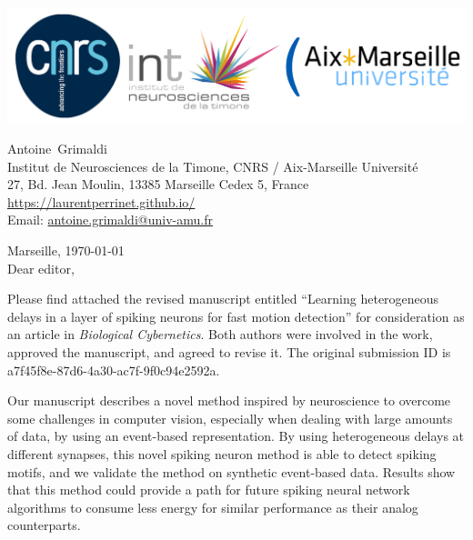 \documentclass[10pt,english]{article}
\makeatletter
\newcommand{\LastName}{Grimaldi}%
\newcommand{\FirstName}{Antoine}%
\newcommand{\Institute}{Institut de Neurosciences de la Timone, CNRS / Aix-Marseille Universit\'e}%
\newcommand{\Address}{27, Bd. Jean Moulin, 13385 Marseille Cedex 5, France}%
\newcommand{\Website}{\url{https://laurentperrinet.github.io/}}%
\newcommand{\Email}{\url{antoine.grimaldi@univ-amu.fr}}%
\makeatother
\begin{document}
\includegraphics[width=.4\textwidth]{troislogos.png}
\\
\vspace{.1\baselineskip}
\hrulefill
\vspace{.1\baselineskip}

\begin{flushright}
	\FirstName\  \LastName\  \\
	\Institute\\[6pt]
	\Address\\%
	\Website \\
	  Email: \Email \\[6pt]
\end{flushright}
\justifying
\vspace{1\baselineskip}
Marseille, 
\today
\\[12pt] %
	
Dear editor,

Please find attached the revised manuscript entitled ``Learning heterogeneous delays in a layer of spiking neurons for fast motion detection'' for consideration as an article in \emph{Biological Cybernetics}. Both authors were involved in the work, approved the manuscript, and agreed to revise it. The original submission ID is a7f45f8e-87d6-4a30-ac7f-9f0c94e2592a. 

Our manuscript describes a novel method inspired by neuroscience to overcome some challenges in computer vision, especially when dealing with large amounts of data, by using an event-based representation. By using heterogeneous delays at different synapses, this novel spiking neuron method is able to detect spiking motifs, and we validate the method on synthetic event-based data. Results show that this method could provide a path for future spiking neural network algorithms to consume less energy for similar performance as their analog counterparts. 
\end{document}
